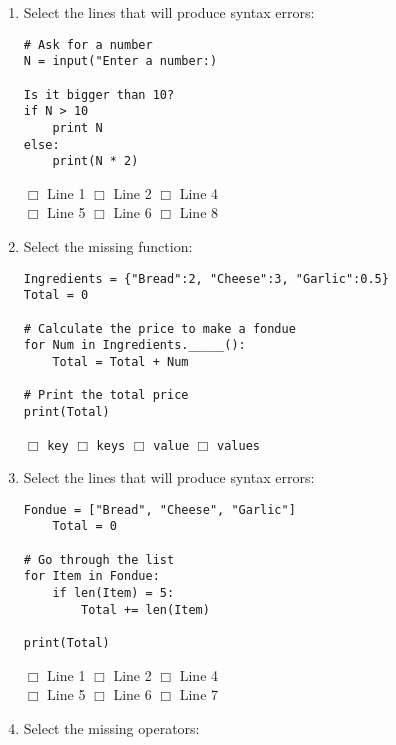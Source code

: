 \documentclass[11pt]{report}
\begin{document}
\begin{enumerate}

    \item Select the lines that will produce syntax errors:

    \begin{verbatim}
# Ask for a number
N = input("Enter a number:)

Is it bigger than 10?
if N > 10
    print N
else:
    print(N * 2)
    \end{verbatim}
    $\Box$ Line 1 \hspace{3em} $\Box$ Line 2 \hspace{3em} $\Box$ Line 4\\
    $\Box$ Line 5 \hspace{3em} $\Box$ Line 6 \hspace{3em} $\Box$ Line 8

    \item Select the missing function:

    \begin{verbatim}
Ingredients = {"Bread":2, "Cheese":3, "Garlic":0.5}
Total = 0

# Calculate the price to make a fondue
for Num in Ingredients._____():
    Total = Total + Num

# Print the total price
print(Total)
    \end{verbatim}
    $\Box$ {\tt key} \hspace{3em} $\Box$ {\tt keys} \hspace{3em} $\Box$ {\tt value} \hspace{3em} $\Box$ {\tt values}

    \item Select the lines that will produce syntax errors:

    \begin{verbatim}
Fondue = ["Bread", "Cheese", "Garlic"]
    Total = 0

# Go through the list
for Item in Fondue:
    if len(Item) = 5:
        Total += len(Item)

print(Total)
    \end{verbatim}
    $\Box$ Line 1 \hspace{3em} $\Box$ Line 2 \hspace{3em} $\Box$ Line 4\\
    $\Box$ Line 5 \hspace{3em} $\Box$ Line 6 \hspace{3em} $\Box$ Line 7

    \item Select the missing operators:


\end{enumerate}
\end{document}
